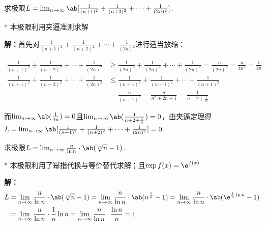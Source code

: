 \begin{problem}
    求极限$L=\lim_{n\to \infty}\ab[\frac{1}{(n+1)^2}+\frac{1}{(n+2) ^2}+\cdots +\frac{1}{(2n)^2} ]$. 
\end{problem}
\begin{draft}
    \vspace{5em}
\end{draft}
\begin{solution}*
    本极限利用夹逼准则求解

    \textbf{解：}首先对$\frac{1}{(n+1)^2}+\frac{1}{(n+2) ^2}+\cdots +\frac{1}{(2n)^2}$进行适当放缩：

    \[
    \begin{aligned}
        \frac{1}{(n+1)^2}+\frac{1}{(n+2) ^2}+\cdots +\frac{1}{(2n)^2}&\geqslant \frac{1}{(2n)^2}+\frac{1}{(2n)^2}+\cdots +\frac{1}{(2n)^2}=\frac{n}{(2n)^2}=\frac{n}{4n^2}=\frac{1}{4n}\\
        \frac{1}{(n+1)^2}+\frac{1}{(n+2) ^2}+\cdots +\frac{1}{(2n)^2}&\leq \frac{1}{(n+1)^2}+\frac{1}{(n+1)^2}+\cdots +\frac{1}{(n+1)^2}\\
        &=\frac{n}{(n+1)^2}=\frac{n}{n^2+2n+1}=\frac{1}{n+2+\frac{1}{n}}
    \end{aligned}
    \]

    而$\lim_{n\to \infty}\ab(\frac{1}{4n} )=0$且$\lim_{n\to \infty}\ab(\frac{1}{n+2+\frac{1}{n}} )=0$，由夹逼定理得$L=\lim_{n\to \infty}\ab[\frac{1}{(n+1)^2}+\frac{1}{(n+2) ^2}+\cdots +\frac{1}{(2n)^2} ] =0$.
\end{solution}


\begin{problem}
    求极限$L=\lim_{n\to \infty} \frac{n}{\ln n}\cdot\ab(\sqrt[n]{n}-1)$. 
\end{problem}
\begin{draft}
    \vspace{5em}
\end{draft}
\begin{solution}*
    本极限利用了幂指代换与等价替代求解；且$\exp f(x) =\e^{f(x)}$

    \textbf{解：}
    \[\begin{aligned}
        L&=\lim_{n\to \infty} \frac{n}{\ln n}\cdot\ab(\sqrt[n]{n}-1 )=\lim_{n\to \infty} \frac{n}{\ln n}\cdot\ab(n^{\frac{1}{n}}-1)=\lim_{n\to \infty} \frac{n}{\ln n}\cdot\ab(\e^{\frac{1}{n}\ln n}-1)\\
        &=\lim_{n\to \infty} \frac{n}{\ln n}\cdot \frac{1}{n}\ln n=\lim_{n\to \infty} \frac{n}{\ln n}\cdot \frac{\ln n}{n}=1
    \end{aligned}\]
\end{solution}

